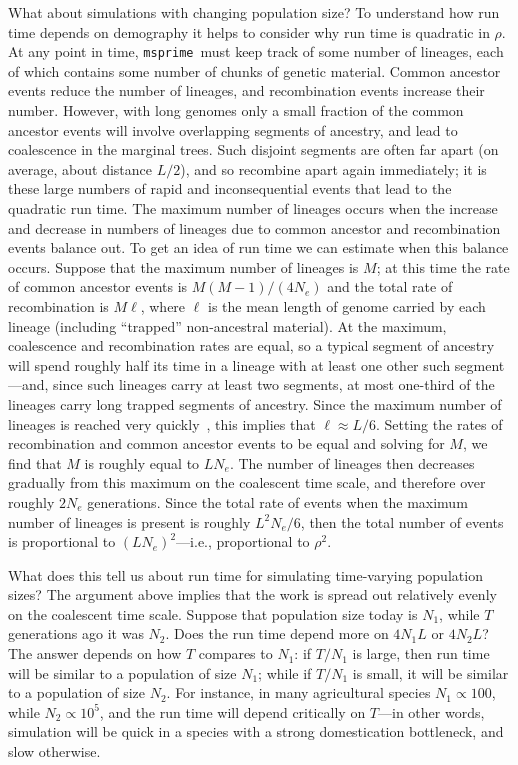 \documentclass{article}
\newcommand{\msprime}[0]{\texttt{msprime}}
\begin{document}
What about simulations with changing population size?
To understand how run time depends on demography
it helps to consider why run time is quadratic in $\rho$.
At any point in time, \msprime\ must keep track of some number of lineages,
each of which contains some number of chunks of genetic material.
Common ancestor events reduce the number of lineages,
and recombination events increase their number.
However, with long genomes
only a small fraction of the common ancestor events
will involve overlapping segments of ancestry,
and lead to coalescence in the marginal trees.
Such disjoint segments are often far apart (on average, about distance $L/2$),
and so recombine apart again immediately;
it is these large numbers of rapid and inconsequential events that
lead to the quadratic run time.
The maximum number of lineages occurs when
the increase and decrease in numbers of lineages due to
common ancestor and recombination events balance out.
To get an idea of run time we can estimate when this balance occurs.
Suppose that the maximum number of lineages is $M$;
at this time the rate of common ancestor events is $M (M-1) / (4 N_e)$
and the total rate of recombination is $M \ell$,
where $\ell$ is the mean length of genome carried by each lineage
(including ``trapped'' non-ancestral material).
At the maximum, coalescence and recombination rates are equal,
so a typical segment of ancestry will spend roughly half its time
in a lineage with at least one other such segment---and,
since such lineages carry at least two segments,
at most one-third of the lineages carry long trapped segments of ancestry.
Since the maximum number of lineages is reached
very quickly~\citep{nelson2020accounting},
this implies that $\ell \approx L / 6$.
Setting the rates of recombination and common ancestor events
to be equal and solving for $M$,
we find that $M$ is roughly equal to $L N_e$.
The number of lineages then decreases gradually from this maximum
on the coalescent time scale, and therefore over roughly $2 N_e$ generations.
Since the total rate of events when the maximum number of lineages is
present is roughly $L^2 N_e / 6$,
then the total number of events is proportional to $(L N_e)^2$---i.e.,
proportional to $\rho^2$.

What does this tell us about run time for simulating time-varying population sizes?
The argument above implies that the work is spread out relatively
evenly on the coalescent time scale.
Suppose that population size today is $N_1$,
while $T$ generations ago it was $N_2$.
Does the run time depend more on $4 N_1 L$ or $4 N_2 L$?
The answer depends on how $T$ compares to $N_1$: if $T/N_1$ is large,
then run time will be similar to a population of size $N_1$;
while if $T/N_1$ is small, it will be similar to a population of size $N_2$.
For instance, in many agricultural species $N_1 \propto 100$, while $N_2 \propto 10^5$,
and the run time will depend critically on $T$---in other words,
simulation will be quick in a species with a strong domestication bottleneck,
and slow otherwise.
\end{document}
